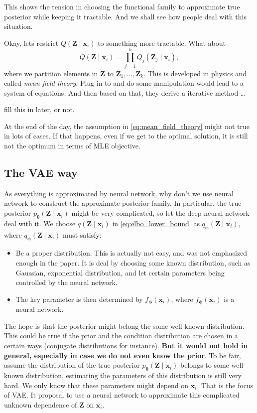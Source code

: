 \documentclass[11pt,a4paper]{article}
\begin{document}
\begin{block}
This shows the tension in choosing the functional family to approximate true posterior while keeping it tractable. And we shall see how people deal with this situation.
\end{block}

Okay, lets restrict $Q(\bm{Z} \mid \bm{x}_i)$ to something more tractable. What about 
\begin{equation}
\label{eq:mean_field_theory}
Q(\bm{Z} \mid \bm{x}_i) = \prod_{j=1}^{k} Q_j(\bm{Z}_j \mid \bm{x}_i),
\end{equation} 
where we partition elements in $\bm{Z}$ to $\bm{Z}_1, \ldots , \bm{Z}_k$. This is developed in physics and called \textit{mean field theory}.
Plug in to and do some manipulation would lead to a system of equations. And then based on that, they derive a iterative method \ldots 

{\red fill this in later, or not}.

At the end of the day, the assumption in \eqref{eq:mean_field_theory} might not true in lots of cases. If that happens, even if we get to the optimal solution, it is still not the optimum in terms of MLE objective.

\subsection{The VAE way}%
\label{sub:the_vae_way}
As everything is approximated by neural network, why don't we use neural network to construct the approximate posterior family. In particular, the true posterior $p_{\boldsymbol \theta}(\bm{Z} \mid \bm{x}_i)$ might be very complicated, so let the deep neural network deal with it.
We choose $q(\bm{Z} \mid \bm{x}_i)$ in \eqref{eq:elbo_lower_bound} as $q_{\boldsymbol \phi}(\bm{Z} \mid \bm{x}_i)$,
where $q_{\boldsymbol \phi}(\bm{Z} \mid \bm{x}_i)$ must satisfy:
\begin{itemize}
    \item Be a proper distribution. This is actually not easy, and was not emphasized enough in the paper. It is deal by choosing some known distribution, such as Gaussian, exponential distribution, and let certain parameters being controlled by the neural network.
    \item The key parameter is then determined by $f_{\boldsymbol \phi}(\bm{x}_i)$, where $f_{\boldsymbol \phi}(\bm{x}_i)$ is a neural network.
\end{itemize}
The hope is that the posterior might belong the some well known distribution. This could be true if the prior and the condition distribution are chosen in a certain ways (conjugate distributions for instance). \textbf{But it would not hold in general, especially in case we do not even know the prior}.
To be fair, assume the distribution of the true posterior $p_{\boldsymbol \theta}(\bm{Z} \mid \bm{x}_i)$ belongs to some well-known distribution, estimating the parameters of this distribution is still very hard. We only know that these parameters might depend on $\bm{x}_i$.
That is the focus of VAE. It proposal to use a neural network to approximate this complicated unknown dependence of $\bm{Z}$ on $\bm{x}_i$.
\end{document}
